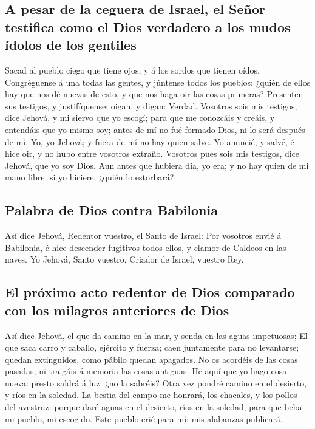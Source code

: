 \hypertarget{a-pesar-de-la-ceguera-de-israel-el-seuxf1or-testifica-como-el-dios-verdadero-a-los-mudos-uxeddolos-de-los-gentiles}{%
\subsection{A pesar de la ceguera de Israel, el Señor testifica como el
Dios verdadero a los mudos ídolos de los
gentiles}\label{a-pesar-de-la-ceguera-de-israel-el-seuxf1or-testifica-como-el-dios-verdadero-a-los-mudos-uxeddolos-de-los-gentiles}}

 Sacad al pueblo ciego que tiene ojos, y á los sordos que
tienen oídos.  Congréguense á una todas las gentes, y
júntense todos los pueblos: ¿quién de ellos hay que nos dé nuevas de
esto, y que nos haga oir las cosas primeras? Presenten sus testigos, y
justifíquense; oigan, y digan: Verdad.  Vosotros sois mis
testigos, dice Jehová, y mi siervo que yo escogí; para que me conozcáis
y creáis, y entendáis que yo mismo soy; antes de mí no fué formado Dios,
ni lo será después de mí.  Yo, yo Jehová; y fuera de mí
no hay quien salve.  Yo anuncié, y salvé, é hice oir, y
no hubo entre vosotros extraño. Vosotros pues sois mis testigos, dice
Jehová, que yo soy Dios.  Aun antes que hubiera día, yo
era; y no hay quien de mi mano libre: si yo hiciere, ¿quién lo
estorbará?

\hypertarget{palabra-de-dios-contra-babilonia}{%
\subsection{Palabra de Dios contra
Babilonia}\label{palabra-de-dios-contra-babilonia}}

 Así dice Jehová, Redentor vuestro, el Santo de Israel:
Por vosotros envié á Babilonia, é hice descender fugitivos todos ellos,
y clamor de Caldeos en las naves.  Yo Jehová, Santo
vuestro, Criador de Israel, vuestro Rey.

\hypertarget{el-pruxf3ximo-acto-redentor-de-dios-comparado-con-los-milagros-anteriores-de-dios}{%
\subsection{El próximo acto redentor de Dios comparado con los milagros
anteriores de
Dios}\label{el-pruxf3ximo-acto-redentor-de-dios-comparado-con-los-milagros-anteriores-de-dios}}

 Así dice Jehová, el que da camino en la mar, y senda en
las aguas impetuosas;  El que saca carro y caballo,
ejército y fuerza; caen juntamente para no levantarse; quedan
extinguidos, como pábilo quedan apagados.  No os acordéis
de las cosas pasadas, ni traigáis á memoria las cosas antiguas.
 He aquí que yo hago cosa nueva: presto saldrá á luz: ¿no
la sabréis? Otra vez pondré camino en el desierto, y ríos en la soledad.
 La bestia del campo me honrará, los chacales, y los
pollos del avestruz: porque daré aguas en el desierto, ríos en la
soledad, para que beba mi pueblo, mi escogido.  Este
pueblo crié para mí; mis alabanzas publicará.

